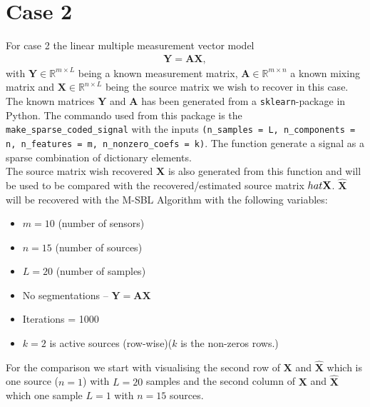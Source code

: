 \section{Case 2}
For case 2 the linear multiple measurement vector model
\begin{align*}
\mathbf{Y} = \mathbf{AX},
\end{align*}
with $\mathbf{Y} \in \mathbb{R}^{m \times L}$ being a known measurement matrix, $\mathbf{A} \in \mathbb{R}^{m \times n}$ a known mixing matrix and $\mathbf{X} \in \mathbb{R}^{n \times L}$ being the source matrix we wish to recover in this case.
\\
The known matrices $\mathbf{Y}$ and $\mathbf{A}$ has been generated from a \texttt{sklearn}-package in Python. The commando used from this package is the \texttt{make\_sparse\_coded\_signal} with the inputs \texttt{(n\_samples = L, n\_components = n, n\_features = m, n\_nonzero\_coefs = k)}. The function generate a signal as a sparse combination of dictionary elements.
\\
The source matrix wish recovered $\mathbf{X}$ is also generated from this function and will be used to be compared with the recovered/estimated source matrix $\\hat{\mathbf{X}}$. $\hat{\mathbf{X}}$ will be recovered with the M-SBL Algorithm with the following variables: 
\begin{itemize}
\item $m = 10$ (number of sensors)
\item $n = 15$ (number of sources)
\item $L = 20$ (number of samples)
\item No segmentations -- $\mathbf{Y} = \mathbf{AX}$
\item Iterations = 1000
\item $k = 2$ is active sources (row-wise)($k$ is the non-zeros rows.)   
\end{itemize}
For the comparison we start with visualising the second row of $\mathbf{X}$ and $\hat{\mathbf{X}}$ which is one source ($n=1$) with $L = 20$ samples and the second column of $\mathbf{X}$ and $\hat{\mathbf{X}}$ which one sample $L=1$ with $n = 15$ sources.
